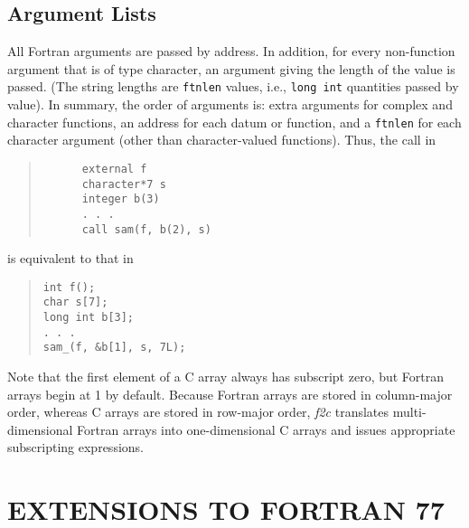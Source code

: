 \documentclass[10pt,a4paper]{article}
\begin{document}
\subsection*{Argument Lists}

All Fortran arguments are passed by address. In addition, for every non-function argument that is of type character, an argument giving the length of the value is passed. (The string lengths are \verb|ftnlen| values, i.e., \verb|long int| quantities passed by value). In summary, the order of arguments is: extra arguments for complex and character functions, an address for each datum or function, and a \verb|ftnlen| for each character argument (other than character-valued functions). Thus, the call in
\begin{quote}
\begin{verbatim}
      external f
      character*7 s
      integer b(3)
      . . .
      call sam(f, b(2), s)
\end{verbatim}
\end{quote}
is equivalent to that in
\begin{quote}
\begin{verbatim}
int f();
char s[7];
long int b[3];
. . .
sam_(f, &b[1], s, 7L);
\end{verbatim}
\end{quote}
Note that the first element of a C array always has subscript zero, but Fortran arrays begin at 1 by default. Because Fortran arrays are stored in column-major order, whereas C arrays are stored in row-major order, \emph{f2c} translates multi-dimensional Fortran arrays into one-dimensional C arrays and issues appropriate subscripting expressions.

\section{EXTENSIONS TO FORTRAN 77} \label{sec:extensions}
\end{document}
